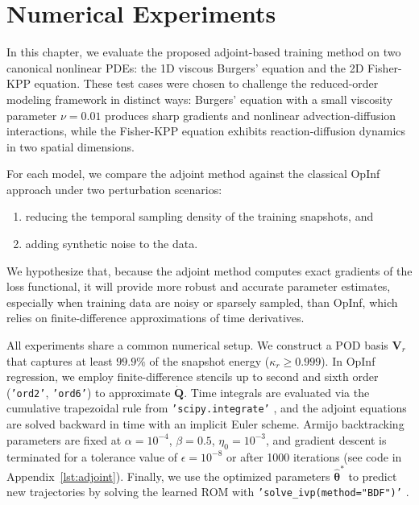 \chapter{Numerical Experiments}
\label{chap:numexp}

In this chapter, we evaluate the proposed adjoint-based training method on two canonical nonlinear PDEs: the 1D viscous Burgers’ equation and the 2D Fisher-KPP equation. These test cases were chosen to challenge the reduced-order modeling framework in distinct ways: Burgers’ equation with a small viscosity parameter $\nu=0.01$ produces sharp gradients and nonlinear advection-diffusion interactions, while the Fisher-KPP equation exhibits reaction-diffusion dynamics in two spatial dimensions.  

For each model, we compare the adjoint method against the classical OpInf approach under two perturbation scenarios:
\begin{enumerate}[label=(\roman*)]
  \item reducing the temporal sampling density of the training snapshots, and
  \item adding synthetic noise to the data.
\end{enumerate}
We hypothesize that, because the adjoint method computes exact gradients of the loss functional, it will provide more robust and accurate parameter estimates, especially when training data are noisy or sparsely sampled, than OpInf, which relies on finite-difference approximations of time derivatives.  

All experiments share a common numerical setup. We construct a POD basis $\mathbf{V}_r$ that captures at least $99.9\%$ of the snapshot energy ($\kappa_r\ge0.999$). In OpInf regression, we employ finite-difference stencils up to second and sixth order (\texttt{'ord2'}, \texttt{'ord6'}) to approximate $\dot{\mathbf{Q}}$. Time integrals are evaluated via the cumulative trapezoidal rule from \texttt{'scipy.integrate'} \cite{virtanen2020scipy}, and the adjoint equations are solved backward in time with an implicit Euler scheme. Armijo backtracking parameters are fixed at $\alpha=10^{-4}$, $\beta=0.5$, $\eta_0=10^{-3}$, and gradient descent is terminated for a tolerance value of $\epsilon=10^{-8}$ or after 1000 iterations (see code in  Appendix~\ref{lst:adjoint}). Finally, we use the optimized parameters $\hat{\bm\theta}^*$ to predict new trajectories by solving the learned ROM with \texttt{'solve\_ivp(method="BDF")'} \cite{scipy-solveivp}.



